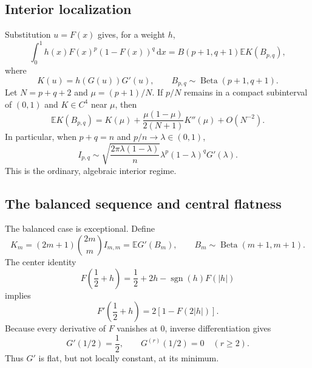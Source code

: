 \documentclass[11pt,oneside]{article}
\theoremstyle{definition}
\theoremstyle{remark}
\newcommand{\F}{F}
\newcommand{\G}{G}
\newcommand{\E}{\mathbb E}
\newcommand{\dd}{\,\mathrm d}
\newcommand{\Beta}{\operatorname{Beta}}
\DeclareMathOperator{\sgn}{sgn}
\begin{document}
\subsection{Interior localization}

Substitution \(u=\F(x)\) gives, for a weight \(h\),
\begin{equation}\label{eq:betaloc}
 \int_0^1h(x)\F(x)^p(1-\F(x))^q\dd x
 =B(p+1,q+1)\E K(B_{p,q}),
\end{equation}
where
\begin{equation}
 K(u)=h(\G(u))\G'(u),
 \qquad B_{p,q}\sim\Beta(p+1,q+1).
\end{equation}
Let \(N=p+q+2\) and \(\mu=(p+1)/N\).  If \(p/N\) remains in a compact
subinterval of \((0,1)\) and \(K\in C^4\) near \(\mu\), then
\begin{equation}\label{eq:betaexpansion}
 \E K(B_{p,q})
 =K(\mu)+\frac{\mu(1-\mu)}{2(N+1)}K''(\mu)+O(N^{-2}).
\end{equation}
In particular, when \(p+q=n\) and \(p/n\to\lambda\in(0,1)\),
\begin{equation}\label{eq:Ipqasymptotic}
 I_{p,q}
 \sim \sqrt{\frac{2\pi\lambda(1-\lambda)}{n}}
 \lambda^p(1-\lambda)^q\G'(\lambda).
\end{equation}
This is the ordinary, algebraic interior regime.

\subsection{The balanced sequence and central flatness}

The balanced case is exceptional.  Define
\begin{equation}\label{eq:Km}
 K_m=(2m+1)\binom{2m}{m}I_{m,m}
 =\E\G'(B_m),
 \qquad B_m\sim\Beta(m+1,m+1).
\end{equation}
The center identity
\begin{equation}\label{eq:centerF}
 \F\!\left(\frac12+h\right)
 =\frac12+2h-\sgn(h)\F(|h|)
\end{equation}
implies
\begin{equation}\label{eq:centerderivative}
 \F'\!\left(\frac12+h\right)=2[1-\F(2|h|)].
\end{equation}
Because every derivative of \(\F\) vanishes at \(0\), inverse differentiation
gives
\begin{equation}\label{eq:Gflat}
 \G'(1/2)=\frac12,
 \qquad \G^{(r)}(1/2)=0\quad(r\ge2).
\end{equation}
Thus \(\G'\) is flat, but not locally constant, at its minimum.
\end{document}
